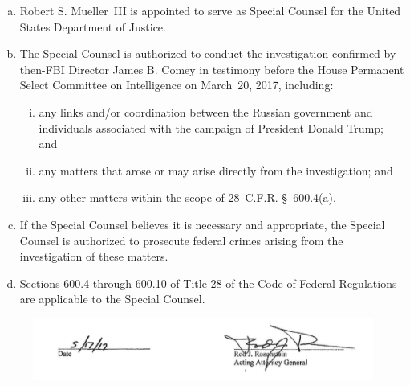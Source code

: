 \begin{enumerate}[(a)]
    \item Robert S. Mueller~III is appointed to serve as Special Counsel for the United States Department of Justice.

    \item The Special Counsel is authorized to conduct the investigation confirmed by then-FBI Director James B. Comey in testimony before the House Permanent Select Committee on Intelligence on March~20, 2017, including:

    \begin{enumerate}[(i)]
        \item any links and/or coordination between the Russian government and individuals associated with the campaign of President Donald Trump; and

        \item any matters that arose or may arise directly from the investigation; and

        \item any other matters within the scope of 28~C.F.R. \S~600.4(a).
    \end{enumerate}

    \item If the Special Counsel believes it is necessary and appropriate, the Special Counsel is authorized to prosecute federal crimes arising from the investigation of these matters.

    \item Sections 600.4 through 600.10 of Title 28 of the Code of Federal Regulations are applicable to the Special Counsel.
\end{enumerate}

\begin{figure}[hb]
    \vspace{-20pt}
    \begin{center}
        \includegraphics[width=6in]{images/appendix-a-signature.png}%
    \end{center}
    \vspace{-20pt}
\end{figure}

\cleardoublepage
